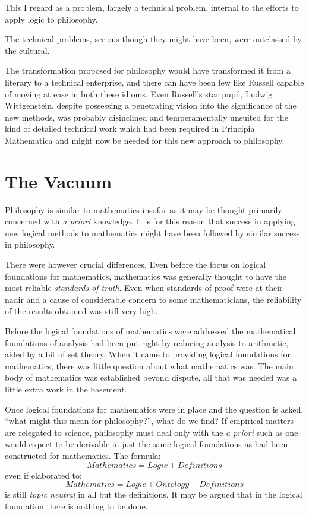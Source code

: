 This I regard as a problem, largely a technical problem, internal to the efforts to apply logic to philosophy.

The technical problems, serious though they might have been, were outclassed by the cultural.

The transformation proposed for philosophy would have transformed it from a literary to a technical enterprise, and there can have been few like Russell capable of moving at ease in both these idioms.
Even Russell's star pupil, Ludwig Wittgenstein, despite possessing a penetrating vision into the significance of the new methods, was probably disinclined and temperamentally unsuited for the kind of detailed technical work which had been required in Principia Mathematica and might now be needed for this new approach to philosophy.

\section{The Vacuum}

Philosophy is similar to mathematics insofar as it may be thought primarily concerned with {\it a priori} knowledge.
It is for this reason that success in applying new logical methods to mathematics might have been followed by similar success in philosophy.

There were however crucial differences.
Even before the focus on logical foundations for mathematics, mathematics was generally thought to have the most reliable {\it standards of truth}.
Even when standards of proof were at their nadir and a cause of considerable concern to some mathematicians, the reliability of the results obtained was still very high.

Before the logical foundations of mathematics were addressed the mathematical foundations of analysis had been put right by reducing analysis to arithmetic, aided by a bit of set theory.
When it came to providing logical foundations for mathematics, there was little question about what mathematics was.
The main body of mathematics was established beyond dispute, all that was needed was a little extra work in the basement.

Once logical foundations for mathematics were in place and the question is asked, ``what might this mean for philosophy?'', what do we find?
If empirical matters are relegated to science, philosophy must deal only with the {\it a priori} such as one would expect to be derivable in just the same logical foundations as had been constructed for mathematics.
The formula:
\begin{equation}
Mathematics = Logic + Definitions
\end{equation}
even if elaborated to:
\begin{equation}
Mathematics = Logic + Ontology + Definitions
\end{equation}
is still {\it topic neutral} in all but the definitions.
It may be argued that in the logical foundation there is nothing to be done.

